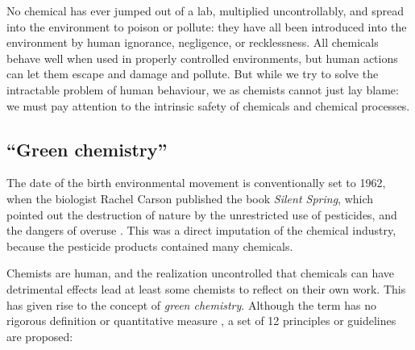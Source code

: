 No chemical has ever jumped out of a lab, multiplied uncontrollably, and spread
into the environment to poison or pollute: they have all been introduced into
the environment by human ignorance, negligence, or recklessness. All chemicals
behave well when used in properly controlled environments, but human actions can
let them escape and damage and pollute. But while we try to solve the
intractable problem of human behaviour, we as chemists cannot just lay blame: we
must pay attention to the intrinsic safety of chemicals and chemical processes.
 
\subsection{``Green chemistry''}

The date of the birth environmental movement is conventionally set to 1962, when
the biologist Rachel Carson published the book \textit{Silent Spring}, which
pointed out the destruction of nature by the unrestricted use of pesticides, and
the dangers of overuse \autocite{Carson1962}. This was a direct imputation of
the chemical industry, because the pesticide products contained many chemicals.

Chemists are human, and the realization uncontrolled that chemicals can have
detrimental effects lead at least some chemists to reflect on their own work.
This has given rise to the concept of \textit{green chemistry}. Although the
term has no rigorous definition or quantitative measure \autocite{Linthorst2010},
a set of 12 principles or guidelines are proposed:

